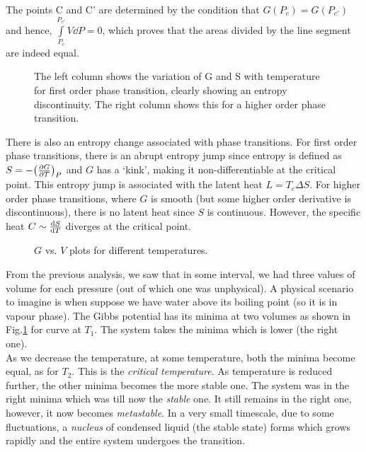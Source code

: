 The points C and C' are determined by the condition that $G(P_c) = G(P_{c'})$ and hence, $\int\limits_{P_c}^{P_{c'}}V\dd P = 0$, which proves that the areas divided by the line segment are indeed equal.\\[0.5cm]
\begin{figure}[H]
\centering 

\caption{The left column shows the variation of G and S with temperature for first order phase transition, clearly showing an entropy discontinuity. The right column shows this for a higher order phase transition.}
\end{figure} 
\noindent
There is also an entropy change associated with phase transitions. For first order phase transitions, there is an abrupt entropy jump since entropy is defined as $S = -\qty(\pdv{G}{T})_P$ and $G$ has a `kink', making it non-differentiable at the critical point. This entropy jump is associated with the latent heat $L=T_c\Delta S$. For higher order phase transitions, where $G$ is smooth (but some higher order derivative is discontinuous), there is no latent heat since $S$ is continuous. However, the specific heat $C\sim \dv{S}{T}$ diverges at the critical point. 
\begin{figure}[H]
    \centering 
    
    \caption{$G$ vs. $V$ plots for different temperatures.
    \label{fig:water} }
\end{figure}
\noindent
From the previous analysis, we saw that in some interval, we had three values of volume for each pressure (out of which one was unphysical). A physical scenario to imagine is when suppose we have water above its boiling point (so it is in vapour phase). The Gibbs potential has its minima at two volumes as shown in Fig.\ref{fig:water} for curve at $T_1$. The system takes the minima which is lower (the right one).\\[0.2cm] As we decrease the temperature, at some temperature, both the minima become equal, as for $T_2$. This is the \textit{critical temperature}. As temperature is reduced further, the other minima becomes the more stable one. The system was in the right minima which was till now the \textit{stable} one. It still remains in the right one, however, it now becomes \textit{metastable}. In a very small timescale, due to some fluctuations, a \textit{nucleus} of condensed liquid (the stable state) forms which grows rapidly and the entire system undergoes the transition.
